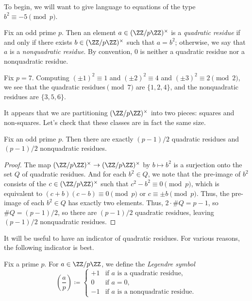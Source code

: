 \documentclass[../notes.tex]{subfiles}
\begin{document}
To begin, we will want to give language to equations of the type $b^2\equiv-5\pmod p$.
\begin{definition}
	Fix an odd prime $p$. Then an element $a\in(\ZZ/p\ZZ)^\times$ is a \textit{quadratic residue} if and only if there exists $b\in(\ZZ/p\ZZ)^\times$ such that $a=b^2$; otherwise, we say that $a$ is a \textit{nonquadratic residue}. By convention, $0$ is neither a quadratic residue nor a nonquadratic residue.
\end{definition}
\begin{example} \label{eq:qrs-of-7}
	Fix $p=7$. Computing $(\pm1)^2\equiv1$ and $(\pm2)^2\equiv4$ and $(\pm3)^2\equiv2\pmod2$, we see that the quadratic residues$\pmod7$ are $\{1,2,4\}$, and the nonquadratic residues are $\{3,5,6\}$.
\end{example}
It appears that we are partitioning $(\ZZ/p\ZZ)^\times$ into two pieces: squares and non-squares. Let's check that these classes are in fact the same size.
\begin{lemma} \label{lem:half-qrs}
	Fix an odd prime $p$. Then there are exactly $(p-1)/2$ quadratic residues and $(p-1)/2$ nonquadratic residues.
\end{lemma}
\begin{proof}
	The map $(\ZZ/p\ZZ)^\times\to(\ZZ/p\ZZ)^\times$ by $b\mapsto b^2$ is a surjection onto the set $Q$ of quadratic residues. And for each $b^2\in Q$, we note that the pre-image of $b^2$ consists of the $c\in(\ZZ/p\ZZ)^\times$ such that $c^2-b^2\equiv0\pmod p$, which is equivalent to $(c+b)(c-b)\equiv0\pmod p$ or $c\equiv\pm b\pmod p$. Thus, the pre-image of each $b^2\in Q$ has exactly two elements. Thus, $2\cdot\#Q=p-1$, so $\#Q=(p-1)/2$, so there are $(p-1)/2$ quadratic residues, leaving $(p-1)/2$ nonquadratic residues.
\end{proof}
It will be useful to have an indicator of quadratic residues. For various reasons, the following indicator is best.
\begin{definition}
	Fix a prime $p$. For $a\in\ZZ/p\ZZ$, we define the \textit{Legendre symbol}
	\[\left(\frac ap\right)\coloneqq\begin{cases}
		+1 & \text{if }a\text{ is a quadratic residue}, \\
		0 & \text{if }a=0, \\
		-1 & \text{if }a\text{ is a nonquadratic residue}.
	\end{cases}\]
\end{definition}
\end{document}
